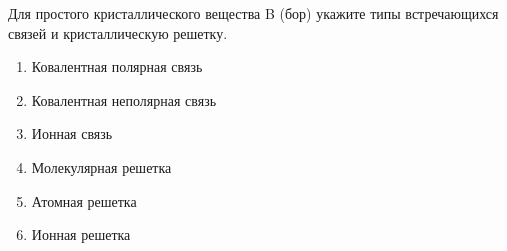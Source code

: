 
Для простого кристаллического вещества B (бор) укажите типы встречающихся связей и кристаллическую решетку.

\begin{enumerate}
    \item Ковалентная полярная связь
    \item Ковалентная неполярная связь
    \item Ионная связь
    \item Молекулярная решетка
    \item Атомная решетка
    \item Ионная решетка
\end{enumerate}



